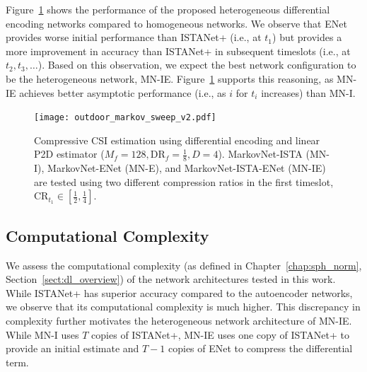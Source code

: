 Figure~\ref{fig:markov-p2d-results} shows the performance of the proposed heterogeneous differential encoding networks compared to homogeneous networks. We observe that ENet provides worse initial performance than ISTANet+ (i.e., at $t_1$) but provides a more improvement in accuracy than ISTANet+ in subsequent timeslots (i.e., at $t_2, t_3, \dots$). Based on this observation, we expect the best network configuration to be the heterogeneous network, MN-IE. Figure~\ref{fig:markov-p2d-results} supports this reasoning, as MN-IE achieves better asymptotic performance (i.e., as $i$ for $t_i$ increases) than MN-I.

\begin{figure}[!hbtp]
    \centering
    \texttt{[image: outdoor\_markov\_sweep\_v2.pdf]}
    \caption{Compressive CSI estimation using differential encoding and  linear P2D estimator ($M_f=128, \text{DR}_f=\frac{1}{8}, D=4$). MarkovNet-ISTA (MN-I), MarkovNet-ENet (MN-E), and MarkovNet-ISTA-ENet (MN-IE) are tested using two different compression ratios in the first timeslot, $\text{CR}_{t_1}\in\left[\frac{1}{2},\frac{1}{4}\right]$.}
    \label{fig:markov-p2d-results}
\end{figure}

\subsection{Computational Complexity}

We assess the computational complexity (as defined in Chapter~\ref{chap:sph_norm}, Section~\ref{sect:dl_overview}) of the network architectures tested in this work. While ISTANet+ has superior accuracy compared to the autoencoder networks, we observe that its computational complexity is much higher. This discrepancy in complexity further motivates the heterogeneous network architecture of MN-IE. While MN-I uses $T$ copies of ISTANet+, MN-IE uses one copy of ISTANet+ to provide an initial estimate and $T-1$ copies of ENet to compress the differential term.

